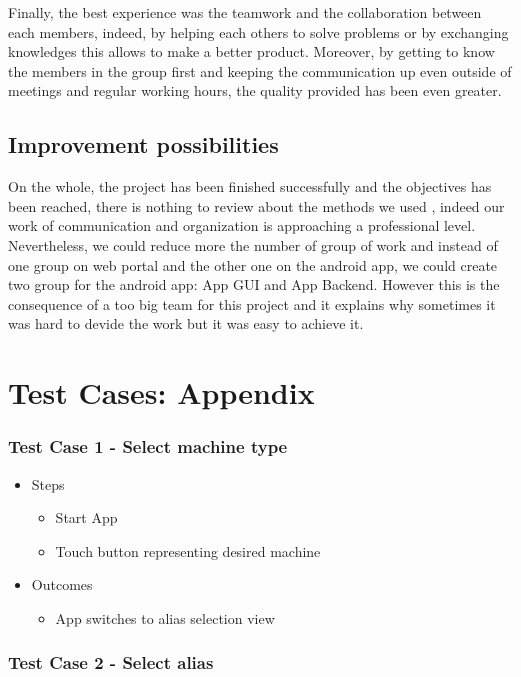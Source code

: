 \documentclass{article}
\begin{document}
Finally, the best experience was the teamwork and the collaboration between each members, indeed, by helping each others to solve problems or by exchanging knowledges this allows to make a better product. Moreover, by getting to know the members in the group first and keeping the communication up even outside of meetings and regular working hours, the quality provided has been even greater.

\subsection{Improvement possibilities}

On the whole, the project has been finished successfully and the objectives has been reached, there is nothing to review about the methods we used , indeed our work of communication and organization is approaching a professional level. Nevertheless, we could reduce more the number of group of work and instead of one group on web portal and the other one on the android app, we could create two group for the android app: App GUI and App Backend. However this is the consequence of a too big team for this project and it explains why sometimes it was hard to devide the work but it was easy to achieve it.

\section{Test Cases: Appendix}

\subsubsection*{Test Case 1 - Select machine type}

\begin{itemize}
\item Steps
\begin{itemize}
\item Start App
\item Touch button representing desired machine
\end{itemize}
\item Outcomes
\begin{itemize}
\item App switches to alias selection view
\end{itemize}
\end{itemize}

\subsubsection*{Test Case 2 - Select alias}
\end{document}
